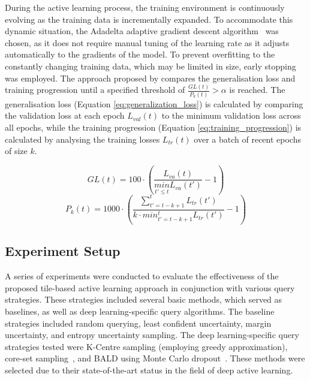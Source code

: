 During the active learning process, the training environment is continuously evolving as the training data is incrementally expanded. To accommodate this dynamic situation, the Adadelta adaptive gradient descent algorithm~\citep{zeiler2012adadelta} was chosen, as it does not require manual tuning of the learning rate as it adjusts automatically to the gradients of the model. To prevent overfitting to the constantly changing training data, which may be limited in size, early stopping was employed. The approach proposed by \cite{prechelt2012early} compares the generalisation loss and training progression until a specified threshold of $\frac{GL(t)}{P_k(t)} > \alpha$ is reached. The generalisation loss (Equation \ref{eq:generalization_loss}) is calculated by comparing the validation loss at each epoch $L_{val}(t)$ to the minimum validation loss across all epochs, while the training progression (Equation \ref{eq:training_progression}) is calculated by analysing the training losses $L_{tr}(t)$ over a batch of recent epochs of size $k$.

\begin{equation}
	GL(t) = 100 \cdot \left ( \frac{L_{va}(t)}{\underset{t'\leq t}{min}L_{va}(t')} - 1 \right )
	\label{eq:generalization_loss}
\end{equation}
\begin{equation}
	P_k(t) = 1000 \cdot \left ( \frac{\sum_{t'=t-k+1}^{t}L_{tr}(t')}{k \cdot min^{t}_{t'=t-k+1}L_{tr}(t')} - 1\right )
	\label{eq:training_progression}
\end{equation}

\subsection{Experiment Setup}
\label{subsec:active_experiments}
A series of experiments were conducted to evaluate the effectiveness of the proposed tile-based active learning approach in conjunction with various query strategies. These strategies included several basic methods, which served as baselines, as well as deep learning-specific query algorithms. The baseline strategies included random querying, least confident uncertainty, margin uncertainty, and entropy uncertainty sampling. The deep learning-specific query strategies tested were K-Centre sampling (employing greedy approximation), core-set sampling~\citep{sener2017active}, and BALD using Monte Carlo dropout~\citep{gal2017deep}. These methods were selected due to their state-of-the-art status in the field of deep active learning. 


